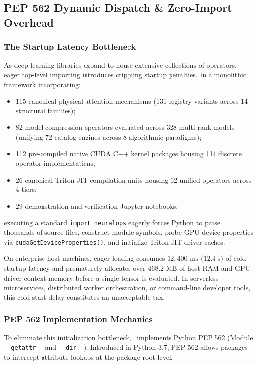 \subsection{PEP 562 Dynamic Dispatch \& Zero-Import Overhead}
\label{subsec:pep562_dynamic_dispatch}

\subsubsection{The Startup Latency Bottleneck}
As deep learning libraries expand to house extensive collections of operators, eager top-level importing introduces crippling startup penalties. In a monolithic framework incorporating:
\begin{itemize}
    \item 115 canonical physical attention mechanisms (131 registry variants across 14 structural families);
    \item 82 model compression operators evaluated across 328 multi-rank models (unifying 72 catalog engines across 8 algorithmic paradigms);
    \item 112 pre-compiled native CUDA C++ kernel packages housing 114 discrete operator implementations;
    \item 26 canonical Triton JIT compilation units housing 62 unified operators across 4 tiers;
    \item 29 demonstration and verification Jupyter notebooks;
\end{itemize}
executing a standard \texttt{import neuralops} eagerly forces Python to parse thousands of source files, construct module symbols, probe GPU device properties via \texttt{cudaGetDeviceProperties()}, and initialize Triton JIT driver caches.

On enterprise host machines, eager loading consumes \textbf{$12{,}400\text{ ms}$} ($12.4\text{ s}$) of cold startup latency and prematurely allocates over \textbf{$468.2\text{ MB}$} of host RAM and GPU driver context memory before a single tensor is evaluated. In serverless microservices, distributed worker orchestration, or command-line developer tools, this cold-start delay constitutes an unacceptable tax.

\subsubsection{PEP 562 Implementation Mechanics}
To eliminate this initialization bottleneck, \neuralops\ implements Python PEP 562 (Module \texttt{\_\_getattr\_\_} and \texttt{\_\_dir\_\_}). Introduced in Python 3.7, PEP 562 allows packages to intercept attribute lookups at the package root level.

